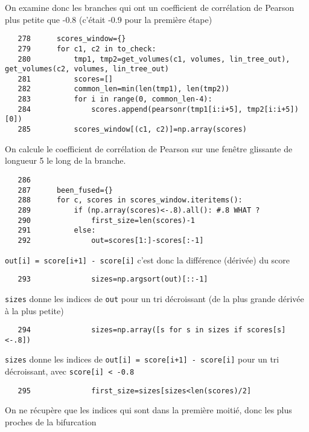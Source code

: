 \documentclass{article}
\def \mycolor {red}
\begin{document}
\color{\mycolor}
On examine donc les branches qui ont un coefficient de corr\'elation de Pearson plus petite que -0.8 (c'\'etait -0.9 pour la premi\`ere \'etape)
\color{black}
\begin{verbatim}
   278	    scores_window={}
   279	    for c1, c2 in to_check:
   280	        tmp1, tmp2=get_volumes(c1, volumes, lin_tree_out), get_volumes(c2, volumes, lin_tree_out)
   281	        scores=[]
   282	        common_len=min(len(tmp1), len(tmp2))
   283	        for i in range(0, common_len-4):
   284	            scores.append(pearsonr(tmp1[i:i+5], tmp2[i:i+5])[0])
   285	        scores_window[(c1, c2)]=np.array(scores)
\end{verbatim} 
\color{\mycolor}
On calcule le coefficient de corr\'elation de Pearson sur une fen\^etre glissante de longueur 5 le long de la branche.
\color{black}
\begin{verbatim}
   286	
   287	    been_fused={}
   288	    for c, scores in scores_window.iteritems():
   289	        if (np.array(scores)<-.8).all(): #.8 WHAT ? 
   290	            first_size=len(scores)-1
   291	        else:
   292	            out=scores[1:]-scores[:-1]
\end{verbatim} 
\color{\mycolor}
\verb|out[i] = score[i+1] - score[i]| c'est donc la diff\'erence (d\'eriv\'ee) du score
\color{black}
\begin{verbatim}
   293	            sizes=np.argsort(out)[::-1]
\end{verbatim} 
\color{\mycolor}
\verb|sizes| donne les indices de \verb|out| pour un tri d\'ecroissant (de la plus grande d\'eriv\'ee \`a la plus petite)
\color{black}
\begin{verbatim}
   294	            sizes=np.array([s for s in sizes if scores[s]<-.8])
\end{verbatim} 
\color{\mycolor}
\verb|sizes| donne les indices de \verb|out[i] = score[i+1] - score[i]| pour un tri d\'ecroissant, avec \verb|score[i] < -0.8|
\color{black}
\begin{verbatim}
   295	            first_size=sizes[sizes<len(scores)/2]
\end{verbatim} 
\color{\mycolor}
On ne r\'ecup\`ere que les indices qui sont dans la premi\`ere moiti\'e, donc les plus proches de la bifurcation
\color{black}
\end{document}
